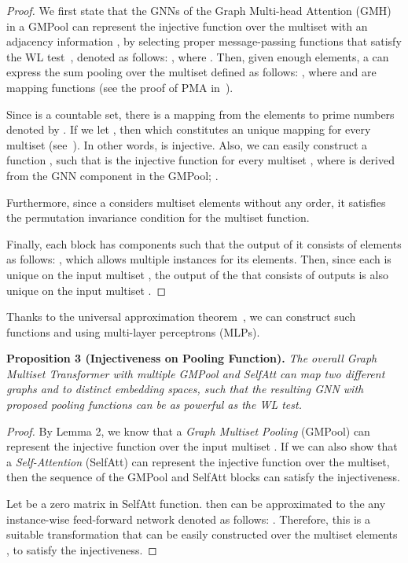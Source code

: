 \begin{proof}
We first state that the GNNs of the Graph Multi-head Attention (GMH) in a GMPool can represent the injective function over the multiset  with an adjacency information , by selecting proper message-passing functions that satisfy the WL test~\citep{GIN, WL/GNN}, denoted as follows: , where . Then, given enough elements, a  can express the sum pooling over the multiset  defined as follows: , where  and  are mapping functions (see the proof of PMA in~\citet{SetTransformer}). 


Since  is a countable set, there is a mapping from the elements to prime numbers denoted by . If we let , then  which constitutes an unique mapping for every multiset  (see~\citet{multiset/injective}). In other words,  is injective. Also, we can easily construct a function , such that  is the injective function for every multiset , where  is derived from the GNN component in the GMPool; .

Furthermore, since a  considers multiset elements without any order, it satisfies the permutation invariance condition for the multiset function.

Finally, each  block has  components such that the output of it consists of  elements as follows: , which allows multiple instances for its elements. Then, since each  is unique on the input multiset , the output of the  that consists of  outputs is also unique on the input multiset .
\end{proof}

Thanks to the universal approximation theorem~\citep{univ/approx}, we can construct such functions  and  using multi-layer perceptrons (MLPs).


\textbf{Proposition 3 (Injectiveness on Pooling Function).} 
\emph{The overall Graph Multiset Transformer with multiple GMPool and SelfAtt can map two different graphs  and  to distinct embedding spaces, such that the resulting GNN with proposed pooling functions can be as powerful as the WL test.}

\begin{proof}
By Lemma 2, we know that a \emph{Graph Multiset Pooling} (GMPool) can represent the injective function over the input multiset . If we can also show that a \emph{Self-Attention} (SelfAtt) can represent the injective function over the multiset, then the sequence of the GMPool and SelfAtt blocks can satisfy the injectiveness.

Let  be a zero matrix in SelfAtt function.  then can be approximated to the any instance-wise feed-forward network denoted as follows: . Therefore, this  is a suitable transformation  that can be easily constructed over the multiset elements , to satisfy the injectiveness.
\end{proof}

